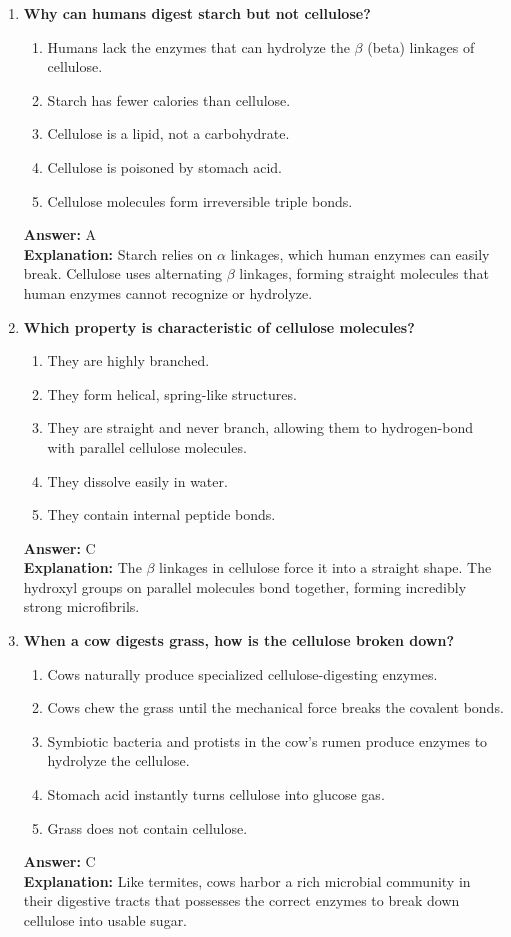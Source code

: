 \documentclass[11pt, a4paper]{article}
\begin{document}
\begin{enumerate}
\item \textbf{Why can humans digest starch but not cellulose?}
\begin{enumerate}[label=\Alph*.]
    \item Humans lack the enzymes that can hydrolyze the $\beta$ (beta) linkages of cellulose.
    \item Starch has fewer calories than cellulose.
    \item Cellulose is a lipid, not a carbohydrate.
    \item Cellulose is poisoned by stomach acid.
    \item Cellulose molecules form irreversible triple bonds.
\end{enumerate}
\textbf{Answer:} A \\
\textbf{Explanation:} Starch relies on $\alpha$ linkages, which human enzymes can easily break. Cellulose uses alternating $\beta$ linkages, forming straight molecules that human enzymes cannot recognize or hydrolyze.

\item \textbf{Which property is characteristic of cellulose molecules?}
\begin{enumerate}[label=\Alph*.]
    \item They are highly branched.
    \item They form helical, spring-like structures.
    \item They are straight and never branch, allowing them to hydrogen-bond with parallel cellulose molecules.
    \item They dissolve easily in water.
    \item They contain internal peptide bonds.
\end{enumerate}
\textbf{Answer:} C \\
\textbf{Explanation:} The $\beta$ linkages in cellulose force it into a straight shape. The hydroxyl groups on parallel molecules bond together, forming incredibly strong microfibrils.

\item \textbf{When a cow digests grass, how is the cellulose broken down?}
\begin{enumerate}[label=\Alph*.]
    \item Cows naturally produce specialized cellulose-digesting enzymes.
    \item Cows chew the grass until the mechanical force breaks the covalent bonds.
    \item Symbiotic bacteria and protists in the cow's rumen produce enzymes to hydrolyze the cellulose.
    \item Stomach acid instantly turns cellulose into glucose gas.
    \item Grass does not contain cellulose.
\end{enumerate}
\textbf{Answer:} C \\
\textbf{Explanation:} Like termites, cows harbor a rich microbial community in their digestive tracts that possesses the correct enzymes to break down cellulose into usable sugar.


\end{enumerate}
\end{document}
